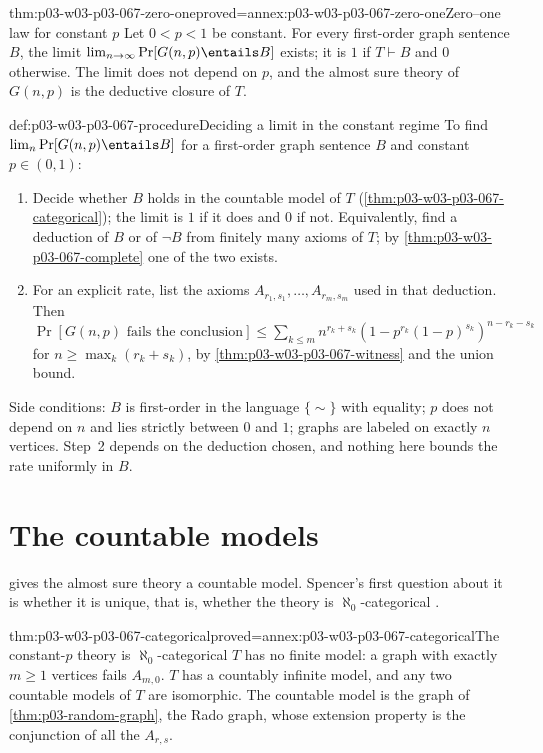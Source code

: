 \begin{hbcorollary}{thm:p03-w03-p03-067-zero-one}{proved=annex:p03-w03-p03-067-zero-one}{Zero--one law for constant \(p\)}
Let \(0<p<1\) be constant.  For every first-order graph sentence \(B\), the
limit \(\lim_{n\to\infty}\Pr[G(n,p)\entails B]\) exists; it is \(1\) if
\(T\vdash B\) and \(0\) otherwise.  The limit does not depend on \(p\), and the
almost sure theory of \(G(n,p)\) is the deductive closure of \(T\).
\end{hbcorollary}

\begin{hbmethod}{def:p03-w03-p03-067-procedure}{Deciding a limit in the constant regime}
To find \(\lim_n\Pr[G(n,p)\entails B]\) for a first-order graph sentence
\(B\) and constant \(p\in(0,1)\):
\begin{enumerate}
\item Decide whether \(B\) holds in the countable model of \(T\)
  (\cref{thm:p03-w03-p03-067-categorical}); the limit is \(1\) if it does and
  \(0\) if not.  Equivalently, find a deduction of \(B\) or of \(\neg B\) from
  finitely many axioms of \(T\); by \cref{thm:p03-w03-p03-067-complete} one
  of the two exists.
\item For an explicit rate, list the axioms \(A_{r_1,s_1},\ldots,A_{r_m,s_m}\)
  used in that deduction.  Then
  \(\Pr[G(n,p)\text{ fails the conclusion}]\leq\sum_{k\leq m}
  n^{r_k+s_k}(1-p^{r_k}(1-p)^{s_k})^{n-r_k-s_k}\) for
  \(n\geq\max_k(r_k+s_k)\), by \cref{thm:p03-w03-p03-067-witness} and the
  union bound.
\end{enumerate}
Side conditions: \(B\) is first-order in the language \(\{\sim\}\) with
equality; \(p\) does not depend on \(n\) and lies strictly between \(0\) and
\(1\); graphs are labeled on exactly \(n\) vertices.  Step~2 depends on the
deduction chosen, and nothing here bounds the rate uniformly in \(B\).
\end{hbmethod}

\section{The countable models}
\label{sec:p03-w03-p03-067-countable}

 gives the almost sure theory a countable
model.  Spencer's first question about it is whether it is unique, that is,
whether the theory is \(\aleph_0\)-categorical
\cite[p.~13]{Spencer2007LogicRandomStructuresAuthor}.

\begin{hbtheorem}{thm:p03-w03-p03-067-categorical}{proved=annex:p03-w03-p03-067-categorical}{The constant-\(p\) theory is \(\aleph_0\)-categorical}
\(T\) has no finite model: a graph with exactly \(m\geq1\) vertices fails
\(A_{m,0}\).  \(T\) has a countably infinite model, and any two countable
models of \(T\) are isomorphic.  The countable model is the graph of
\cref{thm:p03-random-graph}, the Rado graph, whose extension property is the
conjunction of all the \(A_{r,s}\).
\end{hbtheorem}

